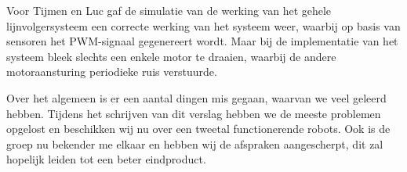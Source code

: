 \documentclass{report}
\begin{document}
Voor Tijmen en Luc gaf de simulatie van de werking van het gehele lijnvolgersysteem een correcte werking van het systeem weer, waarbij op basis van sensoren het PWM-signaal gegenereert wordt. Maar bij de implementatie van het systeem bleek slechts een enkele motor te draaien, waarbij de andere motoraansturing periodieke ruis verstuurde.

Over het algemeen is er een aantal dingen mis gegaan, waarvan we veel geleerd hebben. Tijdens het schrijven van dit verslag hebben we de meeste problemen opgelost en beschikken wij nu over een tweetal functionerende robots. Ook is de groep nu bekender me elkaar en hebben wij de afspraken aangescherpt, dit zal hopelijk leiden tot een beter eindproduct. 
\end{document}
